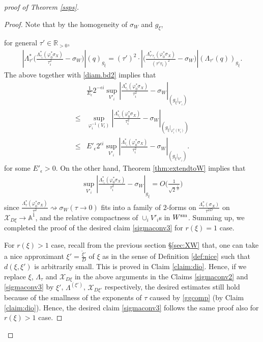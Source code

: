 \documentclass[12pt,a4paper]{amsart}
\theoremstyle{remark}
\theoremstyle{definition}
\def\R{\mathbb{R}}
\def\A{\mathbb{A}}
\def\X{\mathcal{X}}
\begin{document}
\begin{proof}[proof of Theorem \ref{ssps}]
\begin{proof}
Note that 
by the homogeneity of $\sigma_W$ and $g_\xi$, 

for general $\tau'\in \R_{>0}$, 
\begin{align}\label{translate}
|\Lambda_{\tau'}^*\biggl(\frac{\Lambda_{\tau_i}^*(\varphi_0^*\sigma_X)}{\tau_i^{2}}-\sigma_W\biggr)|(q)_{g_\xi}=
(\tau')^2\cdot |\biggl(\frac{\Lambda_{\tau'\tau_i}^*(\varphi_0^*\sigma_X)}{(\tau'\tau_i)^{2}}-\sigma_W\biggr)|(\Lambda_{\tau'}(q))_{g_\xi}. 
\end{align}
The above together with \eqref{diam.bd2} implies that 
\begin{align}
&\frac{1}{E_\epsilon}2^{-\epsilon i}
\sup_{V'_i}
|\frac{\Lambda_{\tau_i}^*(\varphi_0^*\sigma_X)}{\tau_i^{2}}-\sigma_W|_{(g_\xi|_{V'_i})}\\ 
\le 
&\sup_{\varphi_i^{-1}(V_i)}
|\frac{\Lambda_{\tau_i}^*(\varphi_0^*\sigma_X)}{\tau_i^{2}}-\sigma_W|_{(g_\xi|_{\varphi_i^* (V_i)})}\\
\le 
&E'_\epsilon 2^{\epsilon i}
\sup_{V'_i}
|\frac{\Lambda_{\tau_i}^*(\varphi_0^*\sigma_X)}{\tau_i^{2}}-\sigma_W|_{(g_\xi|_{V'_i})}. 
\end{align}
for some $E'_\epsilon>0$. 
On the other hand, Theorem \ref{thm:extendtoW} implies that 
\begin{align}
\sup_{V'_i}
|\frac{\Lambda_{\tau_i}^*(\varphi_0^*\sigma_X)}{\tau_i^{2}}-\sigma_W|_{g_\xi}=O\biggl(\frac{1}{\sqrt{2}^{\frac{i}{D}}}\biggr)
\end{align}
since $\frac{\Lambda_{\tau}^*(\varphi_0^*\sigma_X)}{\tau^{2}}
\rightsquigarrow \sigma_W (\tau\to 0)$ fits into a 
family of $2$-forms on 
$\frac{\Lambda_\tau^*(\sigma_X)}{\tau^{2D}}$ on $\X_{D\xi}\to \A^1$, 
and the relative compactness of $\cup_i V'_i$s in $W^{\rm sm}$. 
Summing up, 
we completed the proof of 
the desired claim \ref{sigmaconv3} for $r(\xi)=1$ case. 

For $r(\xi)>1$ case, recall from the previous section 
\S \ref{sec:XW} that, one can take a nice approximant 
$\xi'=\frac{\tilde{\xi}'}{D}$ of 
$\xi$ as in the sense of Definition \ref{def:nice} such that 
$d(\xi,\xi')$ is arbitrarily small. This is proved in 
Claim \ref{claim:dio}. Hence, if we replace 
$\xi$, $\Lambda_\tau$ and $\X_{D\xi}$ 
in the above arguments 
in the Claims \ref{sigmaconv2} and \ref{sigmaconv3} 
by $\xi'$, $\Lambda^{(\xi')}$, $\X_{D\xi'}$ respectively, 
the desired estimates still hold because of the smallness of the 
exponents of $\tau$ caused by \eqref{ggcomp} (by 
Claim \ref{claim:dio}). Hence, 
the desired claim \ref{sigmaconv3} follows the same proof also 
for $r(\xi)>1$ case. 
\end{proof}


\end{proof}
\end{document}
